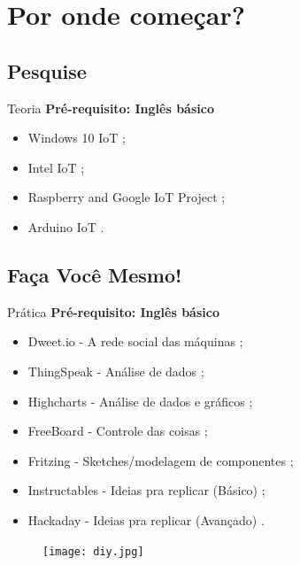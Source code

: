 \section{Por onde começar?}
\ncframesummary

\subsection*{Pesquise}
\begin{frame}{}
	\begin{block}{Teoria} %
		\textbf{Pré-requisito: Inglês básico}
		\begin{itemize}
			\item Windows 10 IoT \cite{WindowsIot};
			\item Intel IoT \cite{IntelIot};
			\item Raspberry and Google IoT Project \cite{RaspberryGoogleIot};
			\item Arduino IoT \cite{ArduinoIot}.		
		\end{itemize}
	\end{block}
\end{frame}

\subsection*{Faça Você Mesmo!}
\begin{frame}{}
	\begin{block}{Prática} %
		\textbf{Pré-requisito: Inglês básico}
		\begin{itemize}
			\item Dweet.io - A rede social das máquinas \cite{DweetIot};
			\item ThingSpeak - Análise de dados \cite{ThingSpeakIot};
			\item Highcharts - Análise de dados e gráficos \cite{HighChartsIot};
			\item FreeBoard - Controle das coisas \cite{FreeBoardIot};
			\item Fritzing - Sketches/modelagem de componentes \cite{Fritzing};
			\item Instructables - Ideias pra replicar (Básico) \cite{InstructablesIot};
			\item Hackaday - Ideias pra replicar (Avançado) \cite{HackadayIot}.
		\end{itemize}
	\end{block}
	\begin{figure}[H]
		\texttt{[image: diy.jpg]}\footnotemark
	\end{figure}
	
\end{frame}

